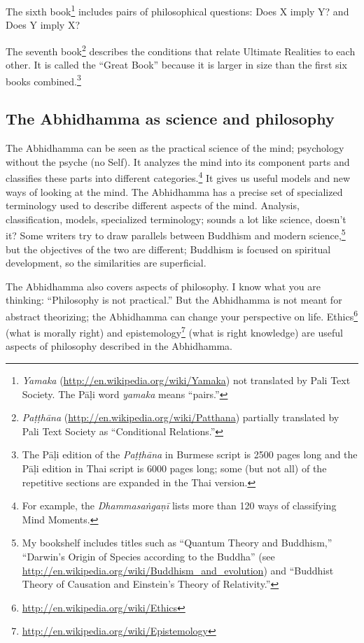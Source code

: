 The sixth book\footnote{\textit{Yamaka} (\url{http://en.wikipedia.org/wiki/Yamaka}) not translated by Pali Text Society. The Pāḷi word \textit{yamaka} means “pairs.”} includes pairs of philosophical questions: Does X imply Y? and Does Y imply X?

The seventh book\footnote{\textit{Paṭṭhāna} (\url{http://en.wikipedia.org/wiki/Patthana}) partially translated by Pali Text Society as “Conditional Relations.”} describes the conditions that relate Ultimate Realities to each other. It is called the “Great Book” because it is larger in size than the first six books combined.\footnote{The Pāḷi edition of the \textit{Paṭṭhāna} in Burmese script is 2500 pages long and the Pāḷi edition in Thai script is 6000 pages long; some (but not all) of the repetitive sections are expanded in the Thai version.}

\subsection*{The Abhidhamma as science and philosophy}

The Abhidhamma can be seen as the practical science of the mind; psychology without the psyche (no Self). It analyzes the mind into its component parts and classifies these parts into different categories.\footnote{For example, the \textit{Dhammasaṅgaṇī} lists more than 120 ways of classifying Mind Moments.} It gives us useful models and new ways of looking at the mind. The Abhidhamma has a precise set of specialized terminology used to describe different aspects of the mind. Analysis, classification, models, specialized terminology; sounds a lot like science, doesn’t it? Some writers try to draw parallels between Buddhism and modern science,\footnote{My bookshelf includes titles such as “Quantum Theory and Buddhism,” “Darwin’s Origin of Species according to the Buddha” (see \url{http://en.wikipedia.org/wiki/Buddhism_and_evolution}) and “Buddhist Theory of Causation and Einstein’s Theory of Relativity.”} but the objectives of the two are different; Buddhism is focused on spiritual development, so the similarities are superficial.

The Abhidhamma also covers aspects of philosophy. I know what you are thinking: “Philosophy is not practical.” But the Abhidhamma is not meant for abstract theorizing; the Abhidhamma can change your perspective on life. Ethics\footnote{\url{http://en.wikipedia.org/wiki/Ethics}} (what is morally right) and epistemology\footnote{\url{http://en.wikipedia.org/wiki/Epistemology}} (what is right knowledge) are useful aspects of philosophy described in the Abhidhamma. 

